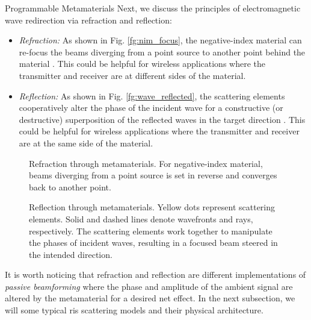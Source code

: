 \begin{section}{}
\begin{subsection}{Programmable Metamaterials}
		Next, we discuss the principles of electromagnetic wave redirection via refraction and reflection:
		\begin{itemize}
			\item \emph{Refraction:} As shown in Fig. \ref{fg:nim_focus}, the negative-index material can re-focus the beams diverging from a point source to another point behind the material \cite{Padilla2006}. This could be helpful for wireless applications where the transmitter and receiver are at different sides of the material.
			\item \emph{Reflection:} As shown in Fig. \ref{fg:wave_reflected}, the scattering elements cooperatively alter the phase of the incident wave for a constructive (or destructive) superposition of the reflected waves in the target direction \cite{Poulakis2022}. This could be helpful for wireless applications where the transmitter and receiver are at the same side of the material.
		\end{itemize}

		\begin{figure}[H]
			\centering
			\caption{Refraction through metamaterials. For negative-index material, beams diverging from a point source is set in reverse and converges back to another point.}
		\end{figure}
		\begin{figure}[H]
			\centering
			\caption{Reflection through metamaterials. Yellow dots represent scattering elements. Solid and dashed lines denote wavefronts and rays, respectively. The scattering elements work together to manipulate the phases of incident waves, resulting in a focused beam steered in the intended direction.}
		\end{figure}
		It is worth noticing that refraction and reflection are different implementations of \emph{passive beamforming} where the phase and amplitude of the ambient signal are altered by the metamaterial for a desired net effect.
		In the next subsection, we will some typical \gls{ris} scattering models and their physical architecture.
	\end{subsection}


\end{section}
